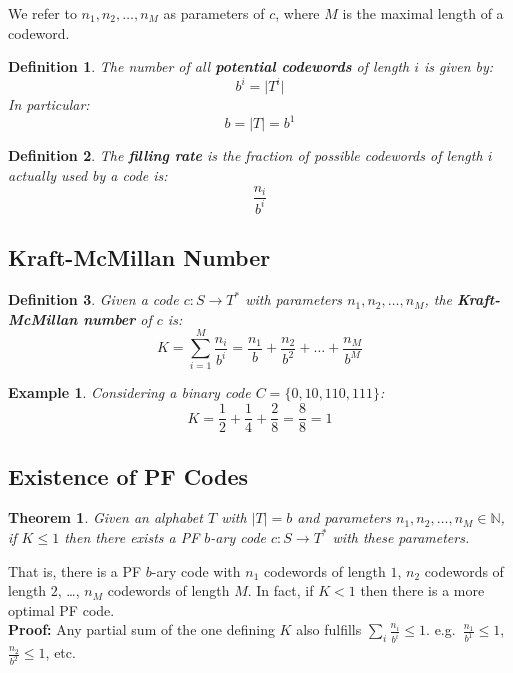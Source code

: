 \documentclass[11pt]{article}
\newtheorem{defn}{Definition}
\newtheorem{eg}{Example}
\newtheorem{theo}{Theorem}
\begin{document}
We refer to $n_1, n_2, \ldots, n_M$ as parameters of $c$, where $M$ is the maximal length of a codeword.

\begin{defn}
  The number of all \textbf{potential codewords} of length $i$ is given by:
  \[ b^i = \lvert T^i \rvert \]
  In particular: 
  \[ b = \lvert T \rvert = b^1 \]
\end{defn}

\begin{defn}
  The \textbf{filling rate} is the fraction of possible codewords of length $i$ actually used by a code is:
  \[ \frac{n_i}{b^i} \]
\end{defn}

\subsection{Kraft-McMillan Number}
\begin{defn}
  Given a code $c : S \rightarrow T^*$ with parameters $n_1, n_2, \ldots, n_M$, the \textbf{Kraft-McMillan number} of $c$ is:
  \[ K = \sum_{i = 1}^{M} \frac{n_i}{b^i} = \frac{n_1}{b} + \frac{n_2}{b^2} + \ldots + \frac{n_M}{b^M} \]
\end{defn}

\begin{eg}
  Considering a binary code $C = \{ 0, 10, 110, 111 \}$:
  \[ K = \frac{1}{2} + \frac{1}{4} + \frac{2}{8} = \frac{8}{8} = 1 \]
\end{eg}

\subsection{Existence of PF Codes}
\begin{theo}
  Given an alphabet $T$ with $\lvert T \rvert = b$ and parameters $n_1, n_2, \ldots, n_M \in \mathbb{N}$, if $K \leq 1$ then there exists a PF $b$-ary code $c : S \rightarrow T^*$ with these parameters.
\end{theo}

That is, there is a PF $b$-ary code with $n_1$ codewords of length $1$, $n_2$ codewords of length $2$, \ldots, $n_M$ codewords of length $M$.
In fact, if $K < 1$ then there is a more optimal PF code. \\

\textbf{Proof:}
Any partial sum of the one defining $K$ also fulfills $\sum_{i} \frac{n_i}{b^i} \leq 1$.
e.g.\ $\frac{n_1}{b^1} \leq 1$, $\frac{n_2}{b^2} \leq 1$, etc.
\end{document}
